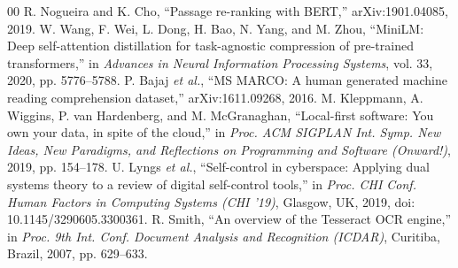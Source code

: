 \documentclass[conference]{IEEEtran}
\begin{document}
\begin{thebibliography}{00}
 R. Nogueira and K. Cho, ``Passage re-ranking with BERT,'' arXiv:1901.04085, 2019.
 W. Wang, F. Wei, L. Dong, H. Bao, N. Yang, and M. Zhou, ``MiniLM: Deep self-attention distillation for task-agnostic compression of pre-trained transformers,'' in \textit{Advances in Neural Information Processing Systems}, vol. 33, 2020, pp. 5776--5788.
 P. Bajaj \textit{et al.}, ``MS MARCO: A human generated machine reading comprehension dataset,'' arXiv:1611.09268, 2016.
 M. Kleppmann, A. Wiggins, P. van Hardenberg, and M. McGranaghan, ``Local-first software: You own your data, in spite of the cloud,'' in \textit{Proc. ACM SIGPLAN Int. Symp. New Ideas, New Paradigms, and Reflections on Programming and Software (Onward!)}, 2019, pp. 154--178.
 U. Lyngs \textit{et al.}, ``Self-control in cyberspace: Applying dual systems theory to a review of digital self-control tools,'' in \textit{Proc. CHI Conf. Human Factors in Computing Systems (CHI '19)}, Glasgow, UK, 2019, doi: 10.1145/3290605.3300361.
 R. Smith, ``An overview of the Tesseract OCR engine,'' in \textit{Proc. 9th Int. Conf. Document Analysis and Recognition (ICDAR)}, Curitiba, Brazil, 2007, pp. 629--633.
\end{thebibliography}
\end{document}

